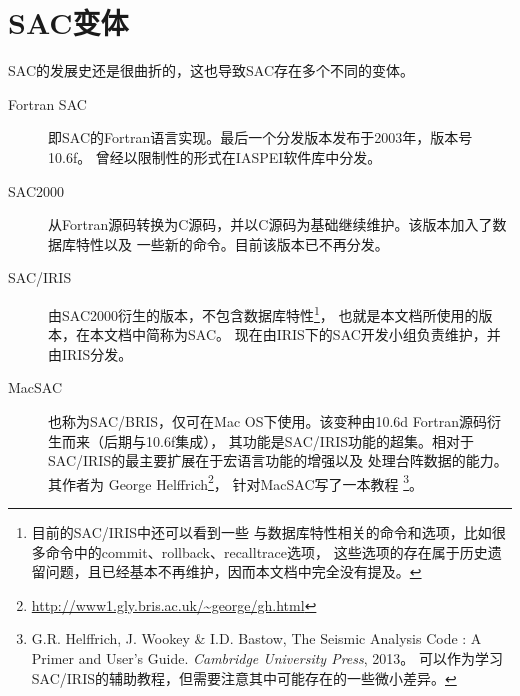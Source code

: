 \section{SAC变体}

SAC的发展史还是很曲折的，这也导致SAC存在多个不同的变体。

\begin{description}
\item[Fortran SAC]  即SAC的Fortran语言实现。最后一个分发版本发布于2003年，版本号10.6f。
                    曾经以限制性的形式在IASPEI软件库中分发。
\item[SAC2000]      从Fortran源码转换为C源码，并以C源码为基础继续维护。该版本加入了数据库特性以及
                    一些新的命令。目前该版本已不再分发。
\item[SAC/IRIS]     由SAC2000衍生的版本，不包含数据库特性\footnote{目前的SAC/IRIS中还可以看到一些
                    与数据库特性相关的命令和选项，比如很多命令中的commit、rollback、recalltrace选项，
                    这些选项的存在属于历史遗留问题，且已经基本不再维护，因而本文档中完全没有提及。}，
                    也就是本文档所使用的版本，在本文档中简称为SAC。
                    现在由IRIS下的SAC开发小组负责维护，并由IRIS分发。
\item[MacSAC]       也称为SAC/BRIS，仅可在Mac OS下使用。该变种由10.6d Fortran源码衍生而来（后期与10.6f集成），
                    其功能是SAC/IRIS功能的超集。相对于SAC/IRIS的最主要扩展在于宏语言功能的增强以及
                    处理台阵数据的能力。其作者为
                    George Helffrich\footnote{\url{http://www1.gly.bris.ac.uk/~george/gh.html}}，
                    针对MacSAC写了一本教程
                    \footnote{G.R. Helffrich, J. Wookey \& I.D. Bastow, The Seismic Analysis Code
                    : A Primer and User's Guide. \textsl{Cambridge University Press}, 2013。
                    可以作为学习SAC/IRIS的辅助教程，但需要注意其中可能存在的一些微小差异。}。
\end{description}
